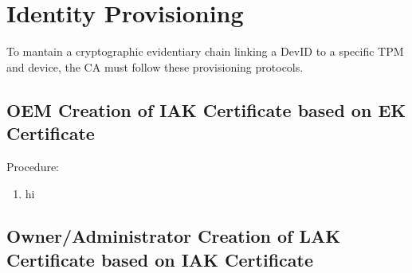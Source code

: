 \chapter{Identity Provisioning}

To mantain a cryptographic evidentiary chain linking a DevID to a specific TPM and device, the CA must follow these provisioning protocols. 





\section{OEM Creation of IAK Certificate based on EK Certificate}
Procedure:
\begin{enumerate}
  \item hi
\end{enumerate}




\section{Owner/Administrator Creation of LAK Certificate based on IAK Certificate}

